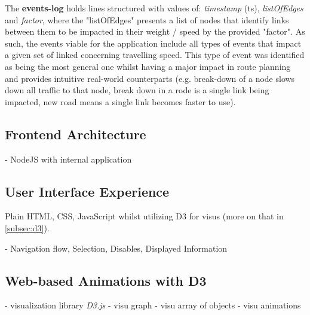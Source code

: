 The \textbf{events-log} holds lines structured with values of: \textit{timestamp} (ts), \textit{listOfEdges} and \textit{factor}, where the "listOfEdges" presents a list of nodes that identify links between them to be impacted in their weight / speed by the provided "factor".
As such, the events viable for the application include all types of events that impact a given set of linked concerning travelling speed. This type of event was identified as being the most general one whilst having a major impact in route planning and provides intuitive real-world counterparts (e.g. break-down of a node slows down all traffic to that node, break down in a rode is a single link being impacted, new road means a single link becomes faster to use).


\subsection{Frontend Architecture}\label{subsec:frontendArchitecture}

- NodeJS with internal application


\subsection{User Interface Experience}

Plain HTML, CSS, JavaScript whilst utilizing D3 for visus (more on that in \autoref{subsec:d3}).

- Navigation flow, Selection, Disables, Displayed Information


\subsection{Web-based Animations with D3}\label{subsec:d3}

- visualization library \textit{D3.js} \cite{bostock2012d3}
  - visu graph
  - visu array of objects
  - visu animations
